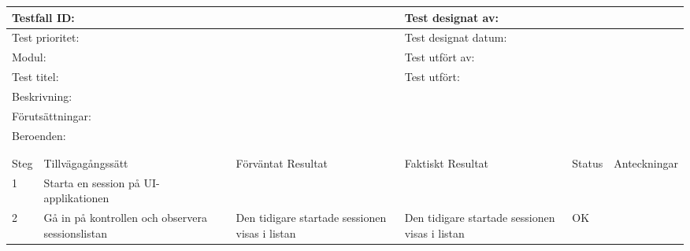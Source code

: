 \documentclass[10pt]{article}
\begin{document}
\begin{tabular}{| p{1cm}|  p{3cm} | p{3cm}| p{3cm}| p{2cm}| p{3cm}|}
	\hline
	  \multicolumn{3}{|l|}{Testfall ID:}&\multicolumn{3}{|l|}{Test designat av:}\\
	  \hline
	  \multicolumn{3}{|l|}{Test prioritet:}&\multicolumn{3}{|l|}{Test designat datum:}\\
	  \hline
	  \multicolumn{3}{|l|}{Modul:}&\multicolumn{3}{|l|}{Test utfört av:}\\
	  \hline
	  \multicolumn{3}{|l|}{Test titel:}&\multicolumn{3}{|l|}{Test utfört:}\\
	  \hline
	  \multicolumn{6}{|p{\textwidth}|}{Beskrivning:}\\
	  \hline
	  \multicolumn{6}{|p{\textwidth}|}{Förutsättningar:}\\
	  \hline
	  \multicolumn{6}{|p{\textwidth}|}{Beroenden:}\\
  	
	\hline
	\multicolumn{6}{|l|}{}\\
	\multicolumn{6}{|l|}{}\\
      	\hline
	Steg&Tillvägagångssätt&Förväntat Resultat&Faktiskt Resultat&Status&Anteckningar \\
	\hline
	1&Starta en session på UI-applikationen&&&&\\
      	\hline
	2&Gå in på kontrollen och observera sessionslistan&Den tidigare startade sessionen visas i listan&Den tidigare startade sessionen visas i listan&OK&\\
      	\hline

\end{tabular}
\end{document}
